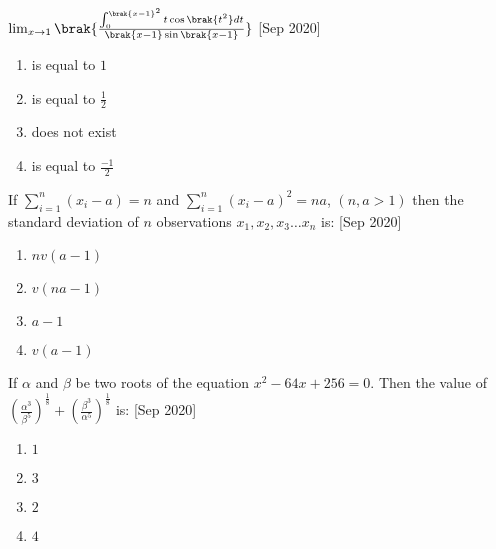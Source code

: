 \iffalse
    \title{2020}
    \author{AI24BTECH11030}
    \section{mcq-single}
\fi

    \item $\lim_{x \rightarrow 1} \brak{\frac{\int_{0}^{\brak{x-1}^2} t \cos \brak{t^2} dt}{\brak{x-1}\sin\brak{x-1}}}$ \hfill [Sep 2020]
    
    \begin{multicols}{4}
    \begin{enumerate}
        \item is equal to $1$
        \item is equal to $\frac{1}{2}$
        \item does not exist
        \item is equal to $\frac{-1}{2}$
    \end{enumerate}
    \end{multicols}
    
    \item If $\sum_{i=1}^{n}(x_i - a) = n$ and $\sum_{i=1}^{n} (x_i - a)^2 = na$, $(n,a >1)$ then the standard deviation of $n$ observations $x_1, x_2, x_3\ldots x_n$ is: \hfill [Sep 2020]
    
    \begin{multicols}{4}
    \begin{enumerate}
        \item $nv(a-1)$
        \item $v(na-1)$
        \item $a-1$
        \item $v(a-1)$
    \end{enumerate}
    \end{multicols}
    
    \item If $\alpha$ and $\beta$ be two roots of the equation $x^2 -64x+256 = 0$. Then the value of $(\frac{\alpha^3}{\beta^5})^\frac{1}{8}+(\frac{\beta^3}{\alpha^5})^\frac{1}{8}$ is: \hfill [Sep 2020]

    \begin{multicols}{4}
    \begin{enumerate}
        \item $1$
        \item $3$
        \item $2$
        \item $4$
    \end{enumerate}
    \end{multicols}
    
